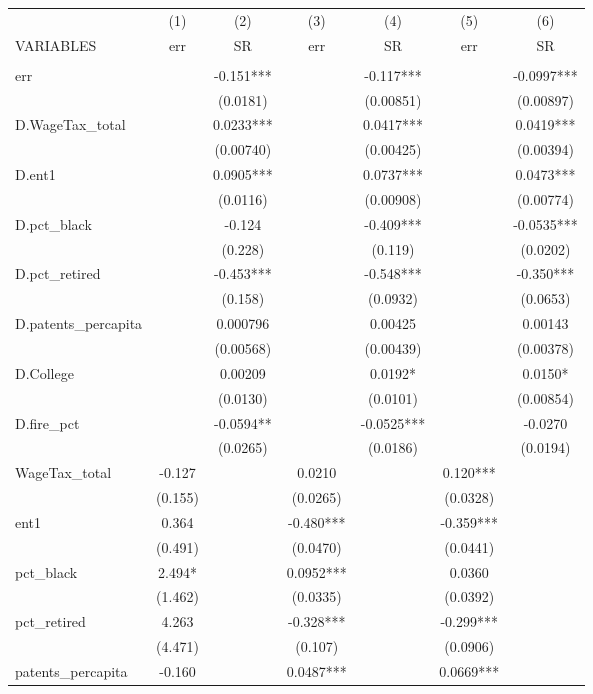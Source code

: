 \begin{tabular}{lcccccc} \hline
 & (1) & (2) & (3) & (4) & (5) & (6) \\
VARIABLES & err & SR & err & SR & err & SR \\ \hline
 &  &  &  &  &  &  \\
err &  & -0.151*** &  & -0.117*** &  & -0.0997*** \\
 &  & (0.0181) &  & (0.00851) &  & (0.00897) \\
D.WageTax\_total &  & 0.0233*** &  & 0.0417*** &  & 0.0419*** \\
 &  & (0.00740) &  & (0.00425) &  & (0.00394) \\
D.ent1 &  & 0.0905*** &  & 0.0737*** &  & 0.0473*** \\
 &  & (0.0116) &  & (0.00908) &  & (0.00774) \\
D.pct\_black &  & -0.124 &  & -0.409*** &  & -0.0535*** \\
 &  & (0.228) &  & (0.119) &  & (0.0202) \\
D.pct\_retired &  & -0.453*** &  & -0.548*** &  & -0.350*** \\
 &  & (0.158) &  & (0.0932) &  & (0.0653) \\
D.patents\_percapita &  & 0.000796 &  & 0.00425 &  & 0.00143 \\
 &  & (0.00568) &  & (0.00439) &  & (0.00378) \\
D.College &  & 0.00209 &  & 0.0192* &  & 0.0150* \\
 &  & (0.0130) &  & (0.0101) &  & (0.00854) \\
D.fire\_pct &  & -0.0594** &  & -0.0525*** &  & -0.0270 \\
 &  & (0.0265) &  & (0.0186) &  & (0.0194) \\
WageTax\_total & -0.127 &  & 0.0210 &  & 0.120*** &  \\
 & (0.155) &  & (0.0265) &  & (0.0328) &  \\
ent1 & 0.364 &  & -0.480*** &  & -0.359*** &  \\
 & (0.491) &  & (0.0470) &  & (0.0441) &  \\
pct\_black & 2.494* &  & 0.0952*** &  & 0.0360 &  \\
 & (1.462) &  & (0.0335) &  & (0.0392) &  \\
pct\_retired & 4.263 &  & -0.328*** &  & -0.299*** &  \\
 & (4.471) &  & (0.107) &  & (0.0906) &  \\
patents\_percapita & -0.160 &  & 0.0487*** &  & 0.0669*** &  \\

\end{tabular}

